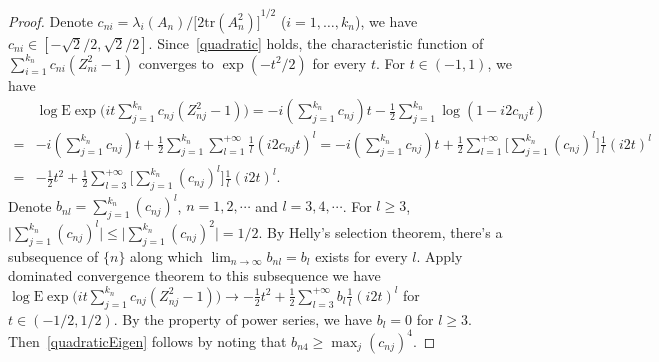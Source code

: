 \documentclass[review]{elsarticle}
\theoremstyle{plain}
\theoremstyle{definition}
\theoremstyle{remark}
\begin{document}
\begin{proof}
    Denote $c_{ni}=\lambda_i(A_n)/{\big[2\mathrm{tr}(A_n^2)\big]}^{1/2}$ ($i=1,\ldots,k_n$), we have $c_{ni}\in[-\sqrt{2}/2,\sqrt{2}/2]$.
    Since~\ref{quadratic} holds, the characteristic function of
        $
        \sum_{i=1}^{k_n}c_{ni}(Z_{ni}^2-1)
    $
    converges to $\exp(-t^2/2)$ for every $t$. For $t\in (-1,1)$, we have
    \begin{equation*}
        \begin{aligned}
            &\log \mathrm{E}\exp{\big(it \sum_{j=1}^{k_n}c_{nj}(Z_{nj}^2-1)\big)}
            =
            -i(\sum_{j=1}^{k_n}c_{nj})t-
            \frac{1}{2}\sum_{j=1}^{k_n}\log(1-i2c_{nj}t)\\
            =&
            -i(\sum_{j=1}^{k_n}c_{nj})t+
            \frac{1}{2}\sum_{j=1}^{k_n}\sum_{l=1}^{+\infty}\frac{1}{l}{(i2c_{nj}t)}^l
            =
            -i(\sum_{j=1}^{k_n}c_{nj})t+
            \frac{1}{2}\sum_{l=1}^{+\infty}\Big[\sum_{j=1}^{k_n}{(c_{nj})}^l\Big]\frac{1}{l}{(i2t)}^l\\
            =&-\frac{1}{2}t^2+
            \frac{1}{2}\sum_{l=3}^{+\infty}\Big[\sum_{j=1}^{k_n}{(c_{nj})}^l\Big]\frac{1}{l}{(i2t)}^l.
        \end{aligned}
    \end{equation*}
    Denote $b_{nl}=\sum_{j=1}^{k_n}{(c_{nj})}^l$, $n=1,2,\cdots$ and $l=3,4,\cdots$. For $l\geq 3$, $\big|\sum_{j=1}^{k_n}{(c_{nj})}^l\big|\leq \big|\sum_{j=1}^{k_n}{(c_{nj})}^2\big|=1/2$.
    By Helly's selection theorem, there's a subsequence of $\{n\}$ along which $\lim_{n\to \infty}b_{nl}=b_l$ exists for every $l$.
    Apply dominated convergence theorem to this subsequence we have
            $\log \mathrm{E}\exp{\big(it \sum_{j=1}^{k_n}c_{nj}(Z_{nj}^2-1)\big)}\to
            -\frac{1}{2}t^2+
            \frac{1}{2}\sum_{l=3}^{+\infty}b_l\frac{1}{l}{(i2t)}^l$ for $t\in(-1/2,1/2)$.
            By the property of power series, we have $b_l=0$ for $l\geq 3$. Then~\ref{quadraticEigen} follows by noting that $b_{n4}\geq \max_j{(c_{nj})}^4$.
\end{proof}
\end{document}
